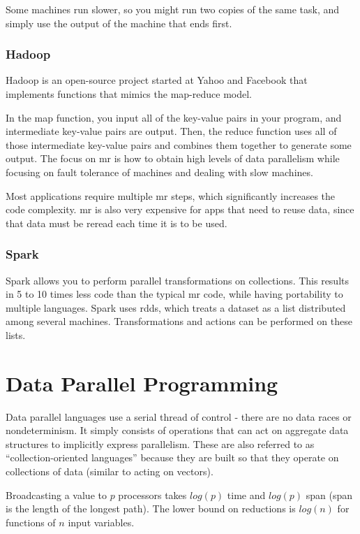 \documentclass[10pt]{article}
\newcounter{subsubsubsection}[subsubsection]
\begin{document}
\begin{flushleft}
Some machines run slower, so you might run two copies of the same task, and simply use the output of the machine that ends first. 

\subsubsection{Hadoop}

Hadoop is an open-source project started at Yahoo and Facebook that implements functions that mimics the map-reduce model. 


In the map function, you input all of the key-value pairs in your program, and intermediate key-value pairs are output. Then, the reduce function uses all of those intermediate key-value pairs and combines them together to generate some output. The focus on \gls{mr} is how to obtain high levels of data parallelism while focusing on fault tolerance of machines and dealing with slow machines.

Most applications require multiple \gls{mr} steps, which significantly increases the code complexity. \gls{mr} is also very expensive for apps that need to reuse data, since that data must be reread each time it is to be used.

\subsubsection{Spark}

Spark allows you to perform parallel transformations on collections. This results in 5 to 10 times less code than the typical \gls{mr} code, while having portability to multiple languages. Spark uses \gls{rdd}s, which treats a dataset as a list distributed among several machines. Transformations and actions can be performed on these lists. 

\section{Data Parallel Programming}

Data parallel languages use a serial thread of control - there are no data races or nondeterminism. It simply consists of operations that can act on aggregate data structures to implicitly express parallelism. 
These are also referred to as ``collection-oriented languages'' because they are built so that they operate on collections of data (similar to acting on vectors). 

Broadcasting a value to \(p\) processors takes \(log(p)\) time and \(log(p)\) span (span is the length of the longest path). The lower bound on reductions is \(log(n)\) for functions of \(n\) input variables. 


\end{flushleft}
\end{document}
